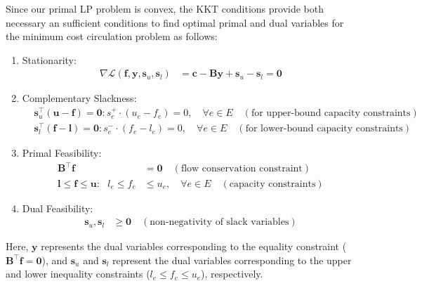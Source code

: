 \documentclass{article} %
\theoremstyle{bfnote}
\begin{document}
Since our primal LP problem is convex, the  KKT conditions provide both necessary an sufficient conditions to find optimal primal and dual variables for the minimum cost circulation problem as follows:
\begin{enumerate}
	\item Stationarity:
	\[
	\begin{aligned}
		\nabla \mathcal{L}(\bm{f}, \bm{y}, \bm{s}_{u}, \bm{s}_{l}) &= \bm{c} - \bm{B}\bm{y} + \bm{s}_{u} - \bm{s}_{l} = \bm{0}
	\end{aligned}
	\]
	
	\item Complementary Slackness:
	\[
	\begin{aligned}
		& \bm{s}_u^{\top}(\bm{u} - \bm{f}) = \bm{0}:  s_e^+ \cdot (u_e - f_e)= 0, \quad \forall e \in E \quad (\text{for upper-bound capacity constraints}) \\
		& \bm{s}_l^{\top}(\bm{f} - \bm{l}) = \bm{0}:  s_e^- \cdot (f_e - l_e)= 0, \quad \forall e \in E \quad(\text{for lower-bound capacity constraints})
	\end{aligned}
	\]
	
	\item Primal Feasibility:
	\[
	\begin{aligned}
		\bm{B}^{\top}\bm{f} &= \bm{0} \quad (\text{flow conservation constraint}) \\
		\bm{l} \leq \bm{f} \leq \bm{u}: \hspace{8pt} l_e \leq f_e &\leq u_e, \quad \forall e \in E \quad (\text{capacity constraints})
	\end{aligned}
	\]
	
	\item Dual Feasibility:
	\[
	\begin{aligned}
		\bm{s}_{u}, \bm{s}_{l} &\geq \bm{0} \quad (\text{non-negativity of slack variables})
	\end{aligned}
	\]
\end{enumerate}


Here, \(\bm{y}\) represents the dual variables corresponding to the equality constraint (\(\bm{B}^{\top}\bm{f} = \bm{0}\)), and \(\bm{s}_{u}\) and \(\bm{s}_{l}\) represent the dual variables corresponding to the upper and lower inequality constraints (\(l_e \leq f_e \leq u_e\)), respectively.
\end{document}

